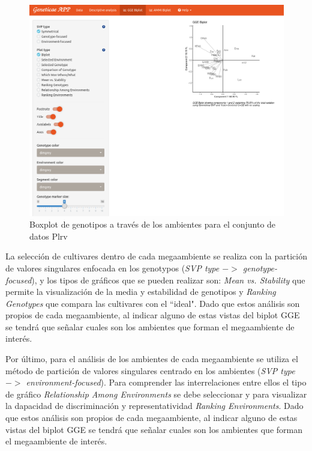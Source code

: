 \begin{figure}[H]
	\begin{center}
		\includegraphics[width=16cm]{./Graficos/www/biplot_GGE.png}
	\end{center}
	\caption{Boxplot de genotipos a través de los ambientes para el conjunto de datos Plrv}
	\label{fig:fig4312}
\end{figure}

La selección de cultivares dentro de cada megaambiente se realiza con la partición de valores singulares enfocada en los genotypos (\emph{SVP type $->$ genotype-focused}), y los tipos de gráficos que se pueden realizar son: \emph{Mean vs. Stability} que permite la visualización de la media y estabilidad de genotipos y \emph{Ranking Genotypes} que compara las cultivares con el ``ideal". Dado que estos análisis son propios de cada megaambiente, al indicar alguno de estas vistas del biplot GGE se tendrá que señalar cuales son los ambientes que forman el megaambiente de interés. 


Por último, para el análisis de los ambientes de cada megaambiente se utiliza el método de partición de valores singulares centrado en los ambientes (\emph{SVP type $->$ environment-focused}). Para comprender las interrelaciones entre ellos el tipo de gráfico \emph{Relationship Among Environments} se debe seleccionar y para visualizar la dapacidad de discriminación y representatividad 
\emph{Ranking Environments}. Dado que estos análisis son propios de cada megaambiente, al indicar alguno de estas vistas del biplot GGE se tendrá que señalar cuales son los ambientes que forman el megaambiente de interés. 


